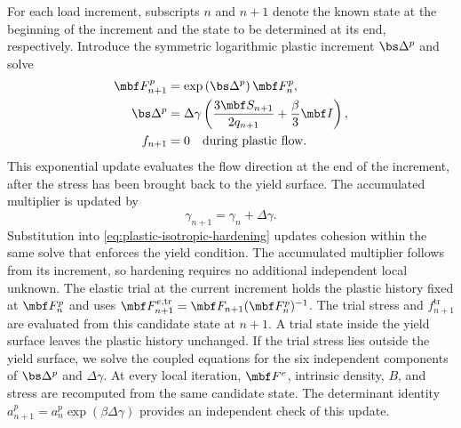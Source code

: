 For each load increment, subscripts \(n\) and \(n+1\) denote the known
state at the beginning of the increment and the state to be determined at
its end, respectively.  Introduce the symmetric logarithmic plastic increment
\(\bs\Delta^p\) and solve
\begin{align}
 \mbf F^p_{n+1}&=\exp\left(\bs\Delta^p\right)\mbf F^p_n,
 \label{eq:plastic-exponential-update}\\
 \bs\Delta^p&=\Delta\gamma\left(
 \frac{3\mbf S_{n+1}}{2q_{n+1}}+\frac{\beta}{3}\mbf I\right),
 \label{eq:implicit-plastic-flow-increment}\\
 f_{n+1}&=0
 \quad\text{during plastic flow}.
 \label{eq:discrete-consistency}
\end{align}
This exponential update evaluates the flow direction at the end of the
increment, after the stress has been brought back to the yield surface.
The accumulated multiplier is updated by
\begin{equation*}
 \gamma_{n+1}=\gamma_n+\Delta\gamma.
\end{equation*}
Substitution into \eqref{eq:plastic-isotropic-hardening} updates cohesion
within the same solve that enforces the yield condition.  The accumulated
multiplier follows from its increment, so hardening requires no additional
independent local unknown.
The elastic trial at the current increment holds the plastic history fixed at
\(\mbf F^p_n\) and uses
\(\mbf F^{e,\mathrm{tr}}_{n+1}=\mbf F_{n+1}(\mbf F^p_n)^{-1}\).
The trial stress and \(f^{\mathrm{tr}}_{n+1}\) are evaluated from this
candidate state at \(n+1\).  A trial state inside the yield surface leaves
the plastic history unchanged.  If the trial stress lies outside the yield
surface, we solve the coupled equations for the six independent components of \(\bs\Delta^p\) and \(\Delta\gamma\).  At every local iteration,
\(\mbf F^e\), intrinsic density, \(B\), and stress are recomputed from the
same candidate state.  The determinant identity
\(a^p_{n+1}=a^p_n\exp(\beta\Delta\gamma)\) provides an independent check
of this update.
